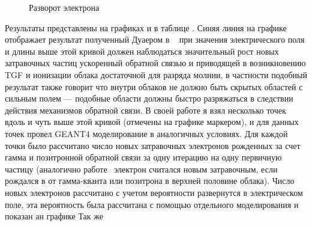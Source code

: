 \begin{figure}[ph!]
    \begin{center}
        \begin{minipage}[h]{0.49\linewidth}
        \end{minipage}
        \hfill
        \begin{minipage}[h]{0.49\linewidth}
        \end{minipage}    
        \vfill
        \begin{minipage}[h]{0.49\linewidth}
        \end{minipage}
        \hfill
        \begin{minipage}[h]{0.49\linewidth}
        \end{minipage} 
        \vfill
        \begin{minipage}[h]{0.49\linewidth}
        \end{minipage}
        \caption{Разворот электрона}
    \end{center}
    \label{fig:storm:reverse_energy_nc_2}
\end{figure}

Результаты представлены на графиках и в таблице . Синяя линия на графике отображает результат полученный Дуаером в ~\cite{dwyer2003fundamental} при значения электрического поля и длины выше этой кривой должен наблюдаться значительный рост новых затравочных частиц ускоренный обратной связью и приводящей в возникновению TGF и ионизации облака достаточной для разряда молнии, в частности подобный результат также говорит что внутри облаков не должно быть скрытых областей с сильным полем --- подобные области должны быстро разряжаться в следствии действия механизмов обратной связи. В своей работе я взял несколько точек вдоль и чуть выше этой кривой (отмечены на графике маркером), и для данных точек провел GEANT4 моделирование в аналогичных условиях. Для каждой точки было рассчитано число новых затравочных электронов рожденных за счет гамма и позитронной обратной связи за одну итерацию на одну первичную частицу (аналогично работе~\cite{dwyer2003fundamental} электрон считался новым затравочным, если рождался в от гамма-кванта или позитрона в верхней половине облака). Число новых электронов рассчитано с учетом вероятности развернутся в электрическом поле, эта вероятность была рассчитана с помощью отдельного моделирования и показан ан графике Так же  



